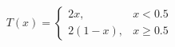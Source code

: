 \documentclass[preview,border=4pt]{standalone}
\begin{document}
\begin{equation}
    T(x) = \begin{cases}
    2x, & x < 0.5 \\
    2(1-x), & x \geq 0.5
    \end{cases}
\end{equation}
\end{document}
